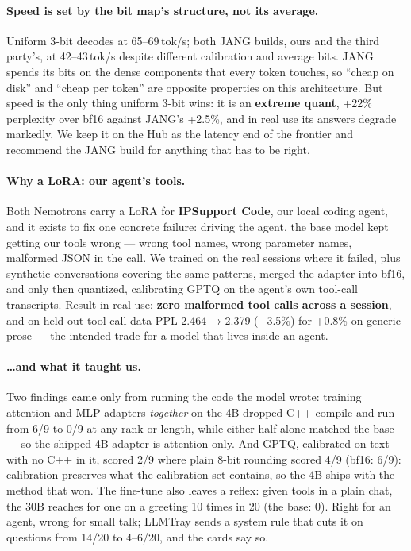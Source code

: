 \documentclass[10pt,letterpaper]{article}
\begin{document}
\paragraph{Speed is set by the bit map's structure, not its average.} Uniform 3-bit decodes at 65--69\,tok/s; both JANG builds, ours and the third party's, at 42--43\,tok/s despite different calibration and average bits. JANG spends its bits on the dense components that every token touches, so ``cheap on disk'' and ``cheap per token'' are opposite properties on this architecture. But speed is the only thing uniform 3-bit wins: it is an \textbf{extreme quant}, +22\% perplexity over bf16 against JANG's +2.5\%, and in real use its answers degrade markedly. We keep it on the Hub as the latency end of the frontier and recommend the JANG build for anything that has to be right.

\paragraph{Why a LoRA: our agent's tools.} Both Nemotrons carry a LoRA for \textbf{IPSupport Code}, our local coding agent, and it exists to fix one concrete failure: driving the agent, the base model kept getting our tools wrong --- wrong tool names, wrong parameter names, malformed JSON in the call. We trained on the real sessions where it failed, plus synthetic conversations covering the same patterns, merged the adapter into bf16, and only then quantized, calibrating GPTQ on the agent's own tool-call transcripts. Result in real use: \textbf{zero malformed tool calls across a session}, and on held-out tool-call data PPL 2.464 → 2.379 (−3.5\%) for +0.8\% on generic prose --- the intended trade for a model that lives inside an agent.

\paragraph{\dots and what it taught us.} Two findings came only from running the code the model wrote: training attention and MLP adapters \emph{together} on the 4B dropped C++ compile-and-run from 6/9 to 0/9 at any rank or length, while either half alone matched the base --- so the shipped 4B adapter is attention-only. And GPTQ, calibrated on text with no C++ in it, scored 2/9 where plain 8-bit rounding scored 4/9 (bf16: 6/9): calibration preserves what the calibration set contains, so the 4B ships with the method that won. The fine-tune also leaves a reflex: given tools in a plain chat, the 30B reaches for one on a greeting 10 times in 20 (the base: 0). Right for an agent, wrong for small talk; LLMTray sends a system rule that cuts it on questions from 14/20 to 4--6/20, and the cards say so.
\end{document}
